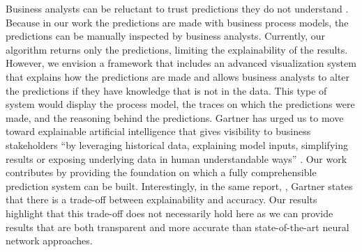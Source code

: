 \documentclass[runningheads]{llncs}
\begin{document}
Business analysts can be reluctant to trust predictions they do not understand \cite{breuker2016comprehensible}. Because in our work the predictions are made with business process models, the predictions can be manually inspected by business analysts. Currently, our algorithm returns only the predictions, limiting the explainability of the results. However, we envision a framework that includes an advanced visualization system that explains how the predictions are made and allows business analysts to alter the predictions if they have knowledge that is not in the data. This type of system would display the process model, the traces on which the predictions were made, and the reasoning behind the predictions. Gartner has urged us to move toward explainable artificial intelligence that gives visibility to business stakeholders ``by leveraging historical data, explaining model inputs, simplifying results or exposing underlying data in human understandable ways'' \cite{Gartner2018ExplainableAI}. Our work contributes by providing the foundation on which a fully comprehensible prediction system can be built. Interestingly, in the same report, \cite{Gartner2018ExplainableAI}, Gartner states that there is a trade-off between explainability and accuracy. Our results highlight that this trade-off does not necessarily hold here as we can provide results that are both transparent and more accurate than state-of-the-art neural network approaches.





\end{document}
